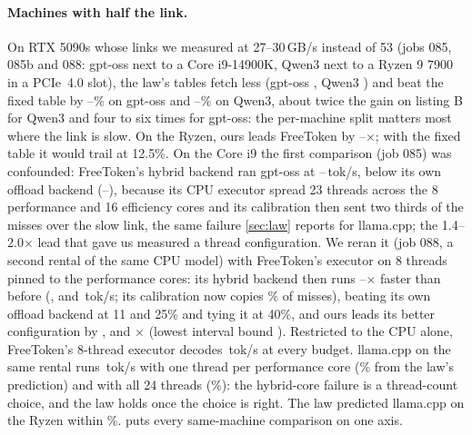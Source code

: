\documentclass[10pt,twocolumn]{article}
\begin{document}
\paragraph{Machines with half the link.} On RTX 5090s whose links we measured at 27--30\,GB/s instead of 53 (jobs
085, 085b and 088: gpt-oss next to a Core i9-14900K, Qwen3 next to a Ryzen 9 7900 in a PCIe~4.0 slot), the law's tables fetch less
(gpt-oss \texttt{\hpTableGpt}, Qwen3 \texttt{\hpTableQwen}) and beat the fixed table by \hpGptLawMin--\hpGptLawMax\% on
gpt-oss and \hpQwenLawMin--\hpQwenLawMax\% on Qwen3, about twice the gain on listing B for Qwen3 and four to six times
for gpt-oss: the per-machine split matters most where the link is slow. On the Ryzen, ours leads FreeToken by
\hpQwenFtMin--\hpQwenFtMax$\times$; with the fixed table it would trail at 12.5\%. On the Core i9 the first comparison
(job 085) was confounded: FreeToken's hybrid backend ran gpt-oss at \iNineHybridMin--\iNineHybridMax\,tok/s, below its
own offload backend (\iNineOffloadMin--\iNineOffloadMax), because its CPU executor spread 23 threads across the 8
performance and 16 efficiency cores and its calibration then sent two thirds of the misses over the slow link, the
same failure \cref{sec:law} reports for llama.cpp; the 1.4--2.0$\times$ lead that gave us measured a thread
configuration. We reran it (job 088, a second rental of the same CPU model) with FreeToken's executor on 8 threads
pinned to the performance cores: its hybrid backend then runs \slHybGainMin--\slHybGainMax$\times$ faster than before
(\slHybLow, \slHybMid{} and \slHybHigh\,tok/s; its calibration now copies \slFetchFrac\% of misses), beating its own
offload backend at 11 and 25\% and tying it at 40\%, and ours leads its better configuration by \slFtLow, \slFtMid{}
and \slFtHigh$\times$ (lowest interval bound \slFtLoMin). Restricted to the CPU alone, FreeToken's 8-thread executor
decodes \slFzeroMid\,tok/s at every budget. llama.cpp on the same rental runs \slLlamaTeight\,tok/s with one thread
per performance core (\slLlamaErrTeight\% from the law's prediction) and \slLlamaTall{} with all 24 threads
(\slLlamaErrTall\%): the hybrid-core failure is a thread-count choice, and the law holds once the choice is right. The
law predicted llama.cpp on the Ryzen within \hpLlamaQwen\%.  puts every same-machine comparison on one
axis.
\end{document}
